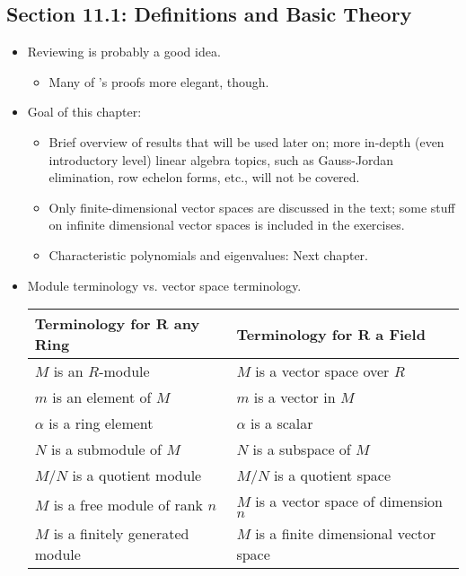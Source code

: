 \documentclass[../notes.tex]{subfiles}
\begin{document}
\subsection*{Section 11.1: Definitions and Basic Theory}
\begin{itemize}
    \item {}Reviewing \textcite{bib:LADRNotes} is probably a good idea.
    \begin{itemize}
        \item Many of \textcite{bib:DummitFoote}'s proofs more elegant, though.
    \end{itemize}
    \item Goal of this chapter:
    \begin{itemize}
        \item Brief overview of results that will be used later on; more in-depth (even introductory level) linear algebra topics, such as Gauss-Jordan elimination, row echelon forms, etc., will not be covered.
        \item Only finite-dimensional vector spaces are discussed in the text; some stuff on infinite dimensional vector spaces is included in the exercises.
        \item Characteristic polynomials and eigenvalues: Next chapter.
    \end{itemize}
    \item Module terminology vs. vector space terminology.
    \begin{table}[h!]
        \centering
        \small
        \renewcommand{\arraystretch}{1.2}
        \begin{tabular}{ll}
            \textbf{Terminology for $\bm{R}$ any Ring} & \textbf{Terminology for $\bm{R}$ a Field}\\
            \hline
            $M$ is an $R$-module & $M$ is a vector space over $R$\\
            $m$ is an element of $M$ & $m$ is a vector in $M$\\
            $\alpha$ is a ring element & $\alpha$ is a scalar\\
            $N$ is a submodule of $M$ & $N$ is a subspace of $M$\\
            $M/N$ is a quotient module & $M/N$ is a quotient space\\
            $M$ is a free module of rank $n$ & $M$ is a vector space of dimension $n$\\
            $M$ is a finitely generated module & $M$ is a finite dimensional vector space\\

\end{tabular}
\end{table}
\end{itemize}
\end{document}
